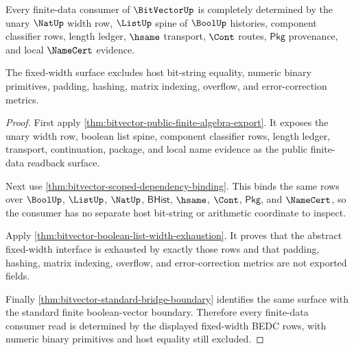 \begin{theorem}
\label{thm:bitvector-fixed-width-consumer-completeness}
Every finite-data consumer of $\BitVectorUp$ is completely determined by the
unary $\NatUp$ width row, $\ListUp$ spine of $\BoolUp$ histories, component
classifier rows, length ledger, $\hsame$ transport, $\Cont$ routes,
$\mathsf{Pkg}$ provenance, and local $\NameCert$ evidence.

The fixed-width surface excludes host bit-string equality, numeric binary
primitives, padding, hashing, matrix indexing, overflow, and error-correction
metrics.
\end{theorem}
\begin{proof}
First apply \autoref{thm:bitvector-public-finite-algebra-export}. It exposes
the unary width row, boolean list spine, component classifier rows, length
ledger, transport, continuation, package, and local name evidence as the
public finite-data readback surface.

Next use \autoref{thm:bitvector-scoped-dependency-binding}. This binds the
same rows over $\BoolUp$, $\ListUp$, $\NatUp$, $\mathsf{BHist}$, $\hsame$,
$\Cont$, $\mathsf{Pkg}$, and $\NameCert$, so the consumer has no separate
host bit-string or arithmetic coordinate to inspect.

Apply \autoref{thm:bitvector-boolean-list-width-exhaustion}. It proves that
the abstract fixed-width interface is exhausted by exactly those rows and that
padding, hashing, matrix indexing, overflow, and error-correction metrics are
not exported fields.

Finally \autoref{thm:bitvector-standard-bridge-boundary} identifies the same
surface with the standard finite boolean-vector boundary. Therefore every
finite-data consumer read is determined by the displayed fixed-width BEDC
rows, with numeric binary primitives and host equality still excluded.
\end{proof}

